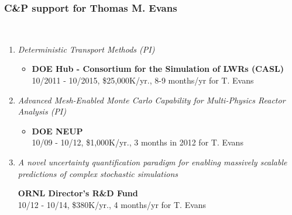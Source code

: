 
\subsubsection{C\&P support for Thomas M. Evans}

\\

\begin{enumerate}
  \vspace{-2ex}
  \parskip = -2pt
  
\item {\em Deterministic Transport Methods (PI)}
  \begin{itemize}
  \item
    {\bf DOE Hub - Consortium for the Simulation of LWRs (CASL)}\\
    10/2011 - 10/2015, \$25,000K/yr.,  8-9 months/yr for T. Evans
  \end{itemize}
  
\item{\em Advanced Mesh-Enabled Monte Carlo Capability for 
    Multi-Physics Reactor Analysis (PI)}
  \begin{itemize}
  \item
    {\bf DOE NEUP}\\
    10/09 - 10/12, \$1,000K/yr., 3 months in 2012 for T. Evans
  \end{itemize}

\item{\em A novel uncertainty quantification paradigm for enabling massively
    scalable predictions of complex stochastic simulations}
  \begin{itemize}
    {\bf ORNL Director's R\&D Fund}\\
    10/12 - 10/14, \$380K/yr., 4 months/yr for T. Evans
  \end{itemize}

\end{enumerate}


\\

